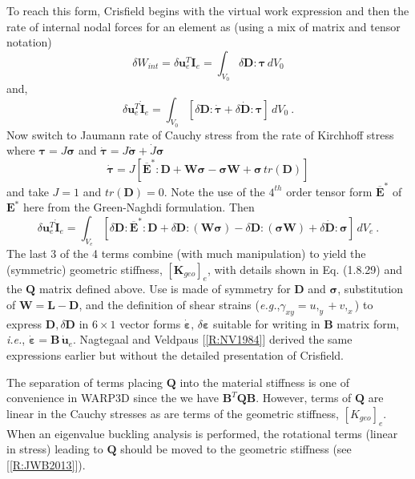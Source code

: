 \documentclass[11pt]{report}
\numberwithin{equation}{section}
\newcommand{\bmf } {\boldsymbol }  %
\newcommand{\eg}{\emph{e.g.},\xspace}
\newcommand{\ie}{\emph{i.e.},\xspace}
\newcommand{\nid}{\noindent}
\newcommand{\vareps}{\varepsilon}
\begin{document}
To reach this form, Crisfield begins with the virtual work expression and then the rate of internal nodal
forces for an element as
(using a mix of matrix and tensor notation)
%
\begin{equation}\label{E:SRCTu}
 \delta W_{int} = \delta \bmf{u}^T_e  \bmf{I}_e    = \int_{V_0} \delta \mathbf{D}: \bmf{\tau} \, dV_0
\end{equation}
%
\nid and,
%
\begin{equation}\label{E:SRCTv}
 \delta \bmf{u}^T_e   \dot{ \bmf{I}}_e =  \int_{V_0} \left [  \delta \mathbf{D}: \dot{\bmf{\tau}} +
 \delta \dot{\mathbf{D}} : \bmf{\tau} \right ]  \, dV_0\ .
\end{equation}
%
\nid Now switch to Jaumann rate of Cauchy stress from the rate of Kirchhoff stress where 
$\bmf{\tau}=J\bmf{\sigma}$ and 
$\dot{\bmf{\tau}}=J\dot{\bmf{\sigma}}+ \dot J \bmf{\sigma}$
%
\begin{equation}\label{E:SRCTw}
 \dot{ \bmf{\tau}} = J \left [ \overline{\mathbf{E}}^*:\mathbf{D} + \mathbf{W} \bmf{\sigma} -
  \bmf{\sigma}\mathbf{W} + \bmf{\sigma}\, tr(\mathbf{D}) \right ]
\end{equation}
%
\nid and take $J=1$ and $tr(\mathbf{D})=0$. Note the use of the $4^{th}$ order tensor
form $\overline {\mathbf{E}}^*$ of $\mathbf{E}^*$ here from 
the Green-Naghdi formulation. Then
%
\begin{equation}\label{E:SRCTx}
 \delta \bmf{u}^T_e   \dot{ \bmf{I}}_e =
  \int_{V_e} \left [  \delta \mathbf{D}: \overline{\mathbf{E}}^*:\mathbf{D} +
 \delta \mathbf{D}: ( \mathbf{W} \bmf{\sigma} )-
  \delta \mathbf{D}:( \bmf{\sigma}\mathbf{W} )  +\delta \dot{\mathbf{D}} : \bmf{\sigma} \right ]  \, dV_e\ .
\end{equation}
%
\nid The last 3 of the 4 terms combine (with much manipulation) to yield the (symmetric)
geometric stiffness, $\left [\mathbf{K}_{geo}\right ]_e$, with details shown in  Eq. (1.8.29) and the
$\mathbf{Q}$ matrix defined above.  Use is made of symmetry for $\mathbf{D}$  and $\bmf{\sigma}$,
substitution of $\mathbf{W}=\mathbf{L}-\mathbf{D}$, and the definition of shear strains (\eg $\gamma_{xy} =
u,_y + v,_x$) to express $\mathbf{D}, \delta \mathbf{D}$ in $6\times 1$ vector 
forms $\dot{\bmf{\vareps}},\, \delta \bmf{\vareps}$ suitable for writing in $\mathbf{B}$ matrix form, \ie
$\dot{\bmf{\vareps}}= \mathbf{B} \,\dot{\bmf{u}}_e$. Nagtegaal and Veldpaus [\ref{R:NV1984}]
derived the same expressions earlier but without the detailed presentation of Crisfield.

The separation of terms placing $\mathbf{Q}$  into the material 
stiffness is one of convenience in WARP3D
since the we have $\mathbf{B}^T\mathbf{Q}\mathbf{B}$.
However, terms of $\mathbf{Q}$ 
are linear in the Cauchy stresses as are terms of the geometric stiffness, $[K_{geo}]_e$. When an
eigenvalue buckling analysis is performed, the rotational terms (linear in stress)
leading to $\mathbf{Q}$ should be moved to the geometric stiffness (see [\ref{R:JWB2013}]).
\end{document}
